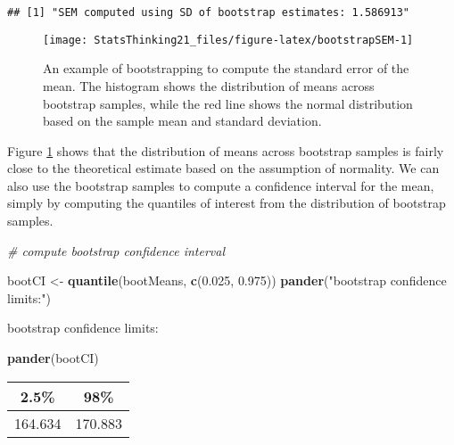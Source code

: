 \documentclass[]{book}
\newenvironment{Shaded}{\begin{snugshade}}{\end{snugshade}}
\newcommand{\KeywordTok}[1]{\textcolor[rgb]{0.13,0.29,0.53}{\textbf{#1}}}
\newcommand{\FloatTok}[1]{\textcolor[rgb]{0.00,0.00,0.81}{#1}}
\newcommand{\StringTok}[1]{\textcolor[rgb]{0.31,0.60,0.02}{#1}}
\newcommand{\CommentTok}[1]{\textcolor[rgb]{0.56,0.35,0.01}{\textit{#1}}}
\newcommand{\NormalTok}[1]{#1}
\theoremstyle{definition}
\theoremstyle{definition}
\theoremstyle{definition}
\theoremstyle{remark}
\begin{document}
\begin{verbatim}
## [1] "SEM computed using SD of bootstrap estimates: 1.586913"
\end{verbatim}

\begin{figure}
\texttt{[image: StatsThinking21\_files/figure-latex/bootstrapSEM-1]} \caption{An example of bootstrapping to compute the standard error of the mean. The histogram shows the distribution of means across bootstrap samples, while the red line shows the normal distribution based on the sample mean and standard deviation.}\label{fig:bootstrapSEM}
\end{figure}

Figure \ref{fig:bootstrapSEM} shows that the distribution of means
across bootstrap samples is fairly close to the theoretical estimate
based on the assumption of normality. We can also use the bootstrap
samples to compute a confidence interval for the mean, simply by
computing the quantiles of interest from the distribution of bootstrap
samples.

\begin{Shaded}
\begin{Highlighting}[]
\CommentTok{# compute bootstrap confidence interval}

\NormalTok{bootCI <-}\StringTok{ }\KeywordTok{quantile}\NormalTok{(bootMeans, }\KeywordTok{c}\NormalTok{(}\FloatTok{0.025}\NormalTok{, }\FloatTok{0.975}\NormalTok{))}
\KeywordTok{pander}\NormalTok{(}\StringTok{"bootstrap confidence limits:"}\NormalTok{)}
\end{Highlighting}
\end{Shaded}

bootstrap confidence limits:

\begin{Shaded}
\begin{Highlighting}[]
\KeywordTok{pander}\NormalTok{(bootCI)}
\end{Highlighting}
\end{Shaded}

\begin{longtable}[]{@{}cc@{}}
\toprule
\begin{minipage}[b]{0.13\columnwidth}\centering\strut
2.5\%\strut
\end{minipage} & \begin{minipage}[b]{0.13\columnwidth}\centering\strut
98\%\strut
\end{minipage}\tabularnewline
\midrule
\endhead
\begin{minipage}[t]{0.13\columnwidth}\centering\strut
164.634\strut
\end{minipage} & \begin{minipage}[t]{0.13\columnwidth}\centering\strut
170.883\strut
\end{minipage}\tabularnewline
\bottomrule
\end{longtable}
\end{document}
